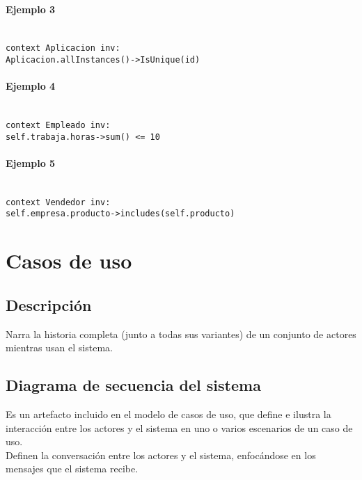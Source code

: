 \documentclass[a4paper,12pt,oneside]{report}
\begin{document}
        \paragraph{Ejemplo 3}
          \texttt{\\
             context Aplicacion inv:\\
             Aplicacion.allInstances()->IsUnique(id)
          }

        \paragraph{Ejemplo 4}
          \texttt{\\
            context Empleado inv:\\
            self.trabaja.horas->sum() <= 10
          }

        \paragraph{Ejemplo 5}
          \texttt{\\
            context Vendedor inv:\\
            self.empresa.producto->includes(self.producto)
          }


    \section{Casos de uso}

      \subsection{Descripci\'on}
        Narra la historia completa (junto a todas sus variantes) de un
        conjunto de actores mientras usan el sistema.

      \subsection{Diagrama de secuencia del sistema}
        Es un artefacto incluido en el modelo de casos de uso, que define e ilustra
        la interacci\'on entre los actores y el sistema en uno o varios escenarios de
        un caso de uso.\\
        Definen la conversaci\'on entre los actores y el sistema, enfoc\'andose
        en los mensajes que el sistema recibe.
\end{document}
